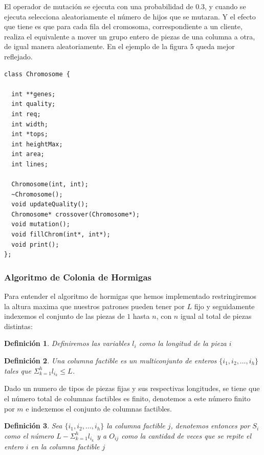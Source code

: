 \documentclass[letterpaper,11pt]{article}
\newtheorem*{definicion}{Definici\'on}
\begin{document}
El operador de mutaci\'on se ejecuta con una probabilidad de 0.3, y cuando se ejecuta selecciona aleatoriamente el n\'umero de hijos que se mutaran. Y el efecto que tiene es que para cada fila del cromosoma, correspondiente a un cliente, realiza el equivalente a mover un grupo entero de piezas de una columna a otra, de igual manera aleatoriamente. En el ejemplo de la figura 5 queda mejor reflejado.


\begin{verbatim}
class Chromosome {

  int **genes;
  int quality;
  int req;
  int width;
  int *tops;
  int heightMax;
  int area;
  int lines;

  Chromosome(int, int);
  ~Chromosome();  
  void updateQuality();
  Chromosome* crossover(Chromosome*);
  void mutation();
  void fillChrom(int*, int*);
  void print();
};
\end{verbatim}

\newpage

\subsubsection{Algoritmo de Colonia de Hormigas}

Para entender el algoritmo de hormigas que hemos implementado restringiremos la altura maxima 
que nuestros patrones pueden tener por $L$ fijo y seguidamente indexemos el conjunto de las piezas de $1$ hasta $n$, 
con $n$ igual al total de piezas distintas:

\begin{definicion}
Definiremos las variables $l_i$ como la longitud de la pieza $i$
\end{definicion}

\begin{definicion}
Una columna factible es un multiconjunto de enteros $\{i_1 ,i_2 ,\dots ,i_h\}$ tales que $\Sigma _{k=1}^h l_{i_k}\leq L$.
\end{definicion}

Dado un numero de tipos de piezas fijas y sus respectivas longitudes, se tiene que el n\'umero 
total de columnas factibles es finito, denotemos a este n\'umero finito por $m$ e indexemos el conjunto de columnas 
factibles.

\begin{definicion}
Sea $\{i_1 ,i_2,\dots ,i_h\}$ la columna factible $j$, denotemos entonces por $S_i$ como el n\'umero $L-\Sigma _{k=1}^h l_{i_k}$ 
y a $O_{ij}$ como la cantidad de veces que se repite el entero $i$ en la columna factible $j$ 
\end{definicion}
\end{document}
